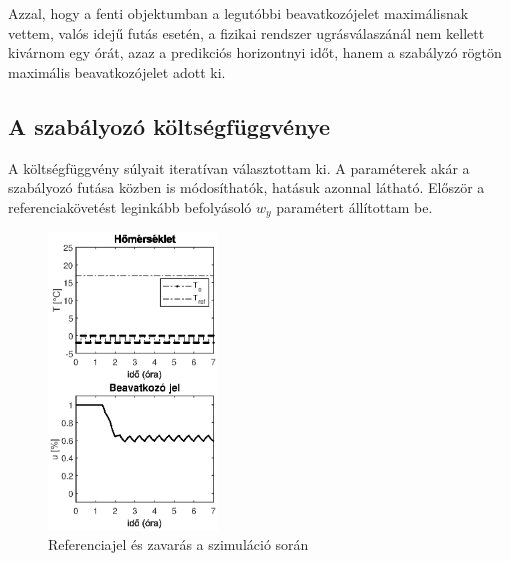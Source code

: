 Azzal, hogy a fenti objektumban a legutóbbi beavatkozójelet maximálisnak vettem, valós idejű futás esetén, a fizikai rendszer ugrásválaszánál nem kellett kivárnom egy órát, azaz a predikciós horizontnyi időt, hanem a szabályzó rögtön maximális beavatkozójelet adott ki.

\subsection{A szabályozó költségfüggvénye}

A költségfüggvény súlyait iteratívan választottam ki. A paraméterek akár a szabályozó futása közben is módosíthatók, hatásuk azonnal látható. Először a referenciakövetést leginkább befolyásoló $w_y$ paramétert állítottam be.
 
\begin{figure}[H]
	\centering
	\includegraphics[width=0.4\textwidth, trim=0 168 0 0, clip,]{figures/realsys/disturbpar}
	\caption{Referenciajel és zavarás a szimuláció során}
	\label{fig:mpc-dist}
\end{figure}

